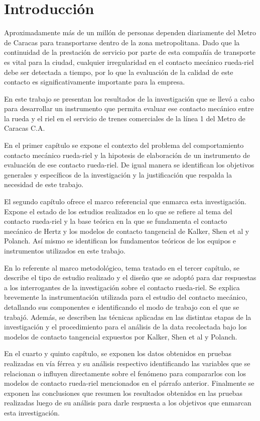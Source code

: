 \documentclass[main]{subfiles}
\begin{document}
\section*{Introducción}
Aproximadamente más de un millón de personas dependen diariamente del Metro de Caracas para transportarse dentro de la zona metropolitana. Dado que la continuidad de la prestación de servicio por parte de esta compañía de transporte es vital para la ciudad, cualquier irregularidad en el contacto mecánico rueda-riel debe ser detectada a tiempo, por lo que la evaluación de la calidad de este contacto es significativamente importante para la empresa. 
 
En este trabajo se presentan los resultados de la investigación que se llevó a cabo para  desarrollar un instrumento que permita evaluar ese contacto mecánico entre la rueda y el riel en el servicio de trenes comerciales de la línea 1 del Metro de Caracas C.A.
 
En el primer capítulo se expone el contexto del problema del comportamiento contacto mecánico rueda-riel y la hipotesis de elaboración de un instrumento de evaluación de ese contacto rueda-riel. De igual manera se identifican los objetivos generales y específicos de la investigación y la justificación que respalda la necesidad de este trabajo.
 
El segundo capítulo ofrece el marco referencial que enmarca esta investigación. Expone el estado de los estudios realizados en lo que se refiere al tema del contacto rueda-riel y la base teórica en la que se fundamenta el contacto mecánico de Hertz y los modelos de contacto tangencial de Kalker, Shen et al y Polanch. Así mismo se identifican los fundamentos teóricos de los equipos e instrumentos utilizados en este trabajo.

En lo referente al marco metodológico, tema tratado en el tercer capítulo, se describe el tipo de estudio realizado y el diseño que se adoptó para dar respuestas a los interrogantes de la investigación sobre el contacto rueda-riel. Se explica brevemente la instrumentación utilizada para el estudio del contacto mecánico, detallando sus componentes e identificando el modo de trabajo con el que se trabajó.  Además, se describen las técnicas aplicadas en las distintas etapas de la investigación y el procedimiento para el análisis de la data recolectada bajo los modelos de contacto tangencial expuestos por Kalker, Shen et al y Polanch.
 
En el cuarto y quinto capítulo, se exponen los datos obtenidos en pruebas realizadas en vía férrea y su análisis respectivo identificando las variables que se relacionan o influyen directamente sobre el fenómeno para compararlos con los modelos de contacto rueda-riel mencionados en el párrafo anterior. Finalmente se exponen las conclusiones que resumen los resultados obtenidos en las pruebas realizadas luego de su análisis para darle respuesta a los  objetivos que enmarcan esta investigación.
\end{document}
